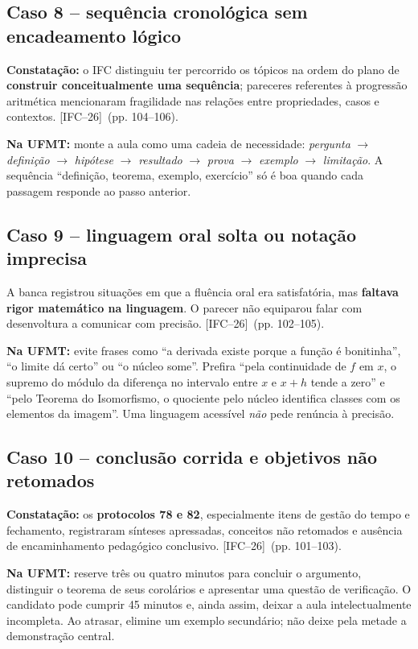 \documentclass[11pt,a4paper]{article}
\newcommand{\fifc}{\textsf{[IFC--26]}}
\begin{document}
\subsection{Caso 8 -- sequência cronológica sem encadeamento lógico}
\textbf{Constatação:} o IFC distinguiu ter percorrido os tópicos na ordem do plano de \textbf{construir conceitualmente uma sequência}; pareceres referentes à progressão aritmética mencionaram fragilidade nas relações entre propriedades, casos e contextos. \fifc\ (pp. 104--106).

\textbf{Na UFMT:} monte a aula como uma cadeia de necessidade: \emph{pergunta} $\to$ \emph{definição} $\to$ \emph{hipótese} $\to$ \emph{resultado} $\to$ \emph{prova} $\to$ \emph{exemplo} $\to$ \emph{limitação}. A sequência ``definição, teorema, exemplo, exercício'' só é boa quando cada passagem responde ao passo anterior.

\subsection{Caso 9 -- linguagem oral solta ou notação imprecisa}
A banca registrou situações em que a fluência oral era satisfatória, mas \textbf{faltava rigor matemático na linguagem}. O parecer não equiparou falar com desenvoltura a comunicar com precisão. \fifc\ (pp. 102--105).

\textbf{Na UFMT:} evite frases como ``a derivada existe porque a função é bonitinha'', ``o limite dá certo'' ou ``o núcleo some''. Prefira ``pela continuidade de $f$ em $x$, o supremo do módulo da diferença no intervalo entre $x$ e $x+h$ tende a zero'' e ``pelo Teorema do Isomorfismo, o quociente pelo núcleo identifica classes com os elementos da imagem''. Uma linguagem acessível \emph{não} pede renúncia à precisão.

\subsection{Caso 10 -- conclusão corrida e objetivos não retomados}
\textbf{Constatação:} os \textbf{protocolos 78 e 82}, especialmente itens de gestão do tempo e fechamento, registraram sínteses apressadas, conceitos não retomados e ausência de encaminhamento pedagógico conclusivo. \fifc\ (pp. 101--103).

\textbf{Na UFMT:} reserve três ou quatro minutos para concluir o argumento, distinguir o teorema de seus corolários e apresentar uma questão de verificação. O candidato pode cumprir 45 minutos e, ainda assim, deixar a aula intelectualmente incompleta. Ao atrasar, elimine um exemplo secundário; não deixe pela metade a demonstração central.
\end{document}
